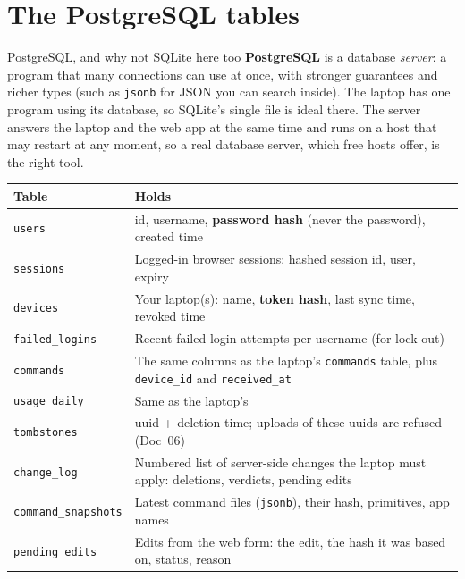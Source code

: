 \documentclass[11pt,a4paper]{article}
\begin{document}
\section{The PostgreSQL tables}

\begin{concept}{PostgreSQL, and why not SQLite here too}
\textbf{PostgreSQL} is a database \emph{server}: a program that many connections can use at
once, with stronger guarantees and richer types (such as \texttt{jsonb} for JSON you can search
inside). The laptop has one program using its database, so SQLite's single file is ideal there.
The server answers the laptop and the web app at the same time and runs on a host that may
restart at any moment, so a real database server, which free hosts offer, is the right tool.
\end{concept}

\begin{center}
\renewcommand{\arraystretch}{1.15}
\begin{tabularx}{\textwidth}{l X}
\toprule
\textbf{Table} & \textbf{Holds} \\
\midrule
\texttt{users}             & id, username, \textbf{password hash} (never the password), created time \\
\texttt{sessions}          & Logged-in browser sessions: hashed session id, user, expiry \\
\texttt{devices}           & Your laptop(s): name, \textbf{token hash}, last sync time, revoked time \\
\texttt{failed\_logins}    & Recent failed login attempts per username (for lock-out) \\
\texttt{commands}          & The same columns as the laptop's \texttt{commands} table, plus \texttt{device\_id} and \texttt{received\_at} \\
\texttt{usage\_daily}      & Same as the laptop's \\
\texttt{tombstones}        & uuid + deletion time; uploads of these uuids are refused (Doc~06) \\
\texttt{change\_log}       & Numbered list of server-side changes the laptop must apply: deletions, verdicts, pending edits \\
\texttt{command\_snapshots}& Latest command files (\texttt{jsonb}), their hash, primitives, app names \\
\texttt{pending\_edits}    & Edits from the web form: the edit, the hash it was based on, status, reason \\
\bottomrule
\end{tabularx}
\end{center}
\end{document}
